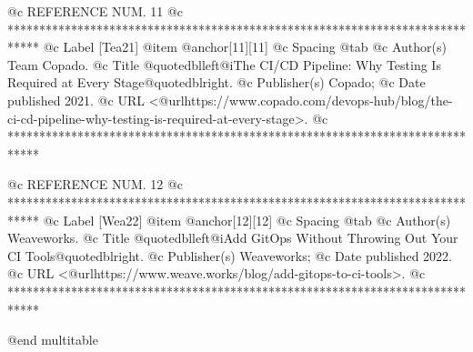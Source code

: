 @c REFERENCE NUM. 11
@c *****************************************************************************
@c Label [Tea21]
@item @anchor{[11]}[11]
@c Spacing
@tab
@c Author(s)
Team Copado.
@c Title
@quotedblleft{}@i{The CI/CD Pipeline: Why Testing Is Required at Every Stage}@quotedblright{}.
@c Publisher(s)
Copado;
@c Date published
2021.
@c URL
<@url{https://www.copado.com/devops-hub/blog/the-ci-cd-pipeline-why-testing-is-required-at-every-stage}>.
@c *****************************************************************************

@c REFERENCE NUM. 12
@c *****************************************************************************
@c Label [Wea22]
@item @anchor{[12]}[12]
@c Spacing
@tab
@c Author(s)
Weaveworks.
@c Title
@quotedblleft{}@i{Add GitOps Without Throwing Out Your CI Tools}@quotedblright{}.
@c Publisher(s)
Weaveworks;
@c Date published
2022.
@c URL
<@url{https://www.weave.works/blog/add-gitops-to-ci-tools}>.
@c *****************************************************************************


@end multitable
